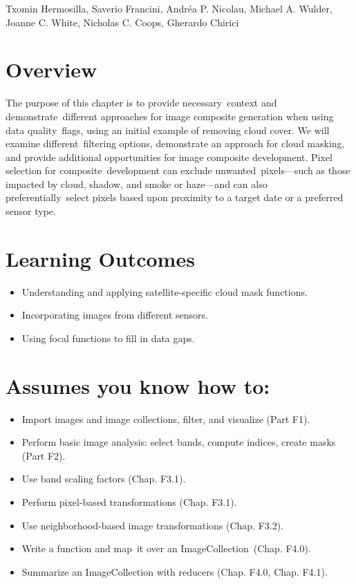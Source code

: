 \documentclass[
  letterpaper,
  DIV=11,
  numbers=noendperiod]{scrreprt}
\providecommand{\tightlist}{%
  \setlength{\itemsep}{0pt}\setlength{\parskip}{0pt}}\usepackage{longtable,booktabs,array}
\begin{document}
Txomin Hermosilla, Saverio Francini, Andréa P. Nicolau, Michael A.
Wulder, Joanne C. White, Nicholas C. Coops, Gherardo Chirici

\hypertarget{overview-10}{%
\section*{Overview}\label{overview-10}}


The purpose of this chapter is to provide necessary~context and
demonstrate~different approaches for image composite generation when
using data quality~flags, using an initial example of removing cloud
cover. We will examine different~filtering options, demonstrate an
approach for cloud masking, and provide additional opportunities for
image composite development. Pixel selection for composite~development
can exclude unwanted~pixels---such as those impacted by cloud, shadow,
and smoke or haze---and can also preferentially~select pixels based upon
proximity to a target date or a preferred sensor type. ~

\hypertarget{learning-outcomes-10}{%
\section*{Learning Outcomes}\label{learning-outcomes-10}}


\begin{itemize}
\tightlist
\item
  Understanding and applying satellite-specific cloud mask functions.
\item
  Incorporating images from different sensors.
\item
  Using focal functions to fill in data gaps.
\end{itemize}

\hypertarget{assumes-you-know-how-to-10}{%
\section*{Assumes you know how to:}\label{assumes-you-know-how-to-10}}


\begin{itemize}
\tightlist
\item
  Import images and image collections, filter, and visualize (Part F1).
\item
  Perform basic image analysis: select bands, compute indices, create
  masks (Part F2).
\item
  Use band scaling factors (Chap. F3.1).
\item
  Perform pixel-based transformations (Chap. F3.1).
\item
  Use neighborhood-based image transformations (Chap. F3.2).
\item
  Write a function and map~it over an ImageCollection~(Chap. F4.0).
\item
  Summarize an ImageCollection with reducers (Chap. F4.0, Chap. F4.1).
\end{itemize}
\end{document}
